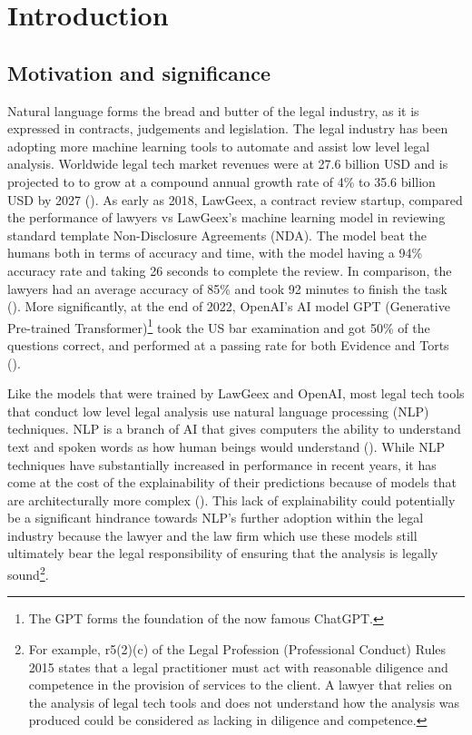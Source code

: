 
\chapter{Introduction} %

\label{chapter1} %

\section{Motivation and significance}
Natural language forms the bread and butter of the legal industry, as it is expressed in contracts, judgements and legislation. The legal industry has been adopting more machine learning tools to automate and assist low level legal analysis. Worldwide legal tech market revenues were at 27.6 billion USD and is projected to to grow at a compound annual growth rate of 4\% to 35.6 billion USD by 2027 (\cite{statista}). As early as 2018, LawGeex, a contract review startup, compared the performance of lawyers vs LawGeex's machine learning model in reviewing standard template Non-Disclosure Agreements (NDA). The model beat the humans both in terms of accuracy and time, with the model having a 94\% accuracy rate and taking 26 seconds to complete the review. In comparison, the lawyers had an average accuracy of 85\% and took 92 minutes to finish the task (\cite{lawgeex}). More significantly, at the end of 2022, OpenAI's AI model GPT (Generative Pre-trained Transformer)\footnote{The GPT forms the foundation of the now famous ChatGPT.} took the US bar examination and got 50\% of the questions correct, and performed at a passing rate for both Evidence and Torts (\cite{bommarito2022}).

Like the models that were trained by LawGeex and OpenAI, most legal tech tools that conduct low level legal analysis use natural language processing (NLP) techniques. NLP is a branch of AI that gives computers the ability to understand text and spoken words as how human beings would understand (\cite{ibm_nlp}). While NLP techniques have substantially increased in performance in recent years, it has come at the cost of the explainability of their predictions because of models that are architecturally more complex (\cite{zini2022}). This lack of explainability could potentially be a significant hindrance towards NLP's further adoption within the legal industry because the lawyer and the law firm which use these models still ultimately bear the legal responsibility of ensuring that the analysis is legally sound\footnote{For example, r5(2)(c) of the Legal Profession (Professional Conduct) Rules 2015 states that a legal practitioner must act with reasonable diligence and competence in the provision of services to the client. A lawyer that relies on the analysis of legal tech tools and does not understand how the analysis was produced could be considered as lacking in diligence and competence.}.

